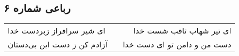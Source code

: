 \begin{center}
\section*{رباعی شماره ۶}
\label{sec:sh006}
\begin{longtable}{l p{0.5cm} r}
ای شیر سرافراز زبردست خدا
&&
ای تیر شهاب ثاقب شست خدا
\\
آزادم کن ز دست این بی‌دستان
&&
دست من و دامن تو ای دست خدا
\\
\end{longtable}
\end{center}
